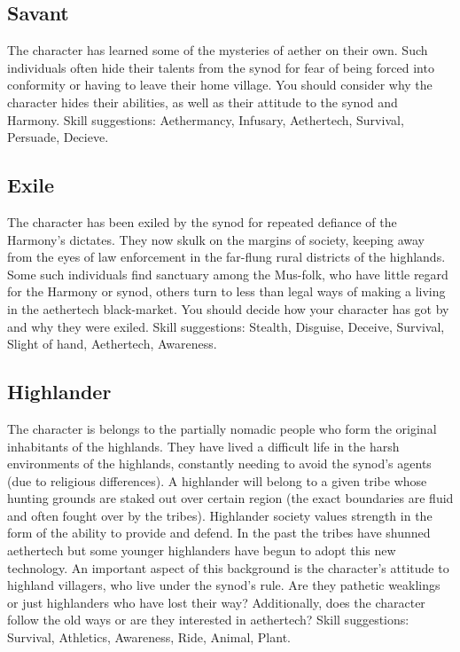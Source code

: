 \documentclass[a4paper,11pt,oneside]{book}
\begin{document}
\subsection{Savant}
The character has learned some of the mysteries of aether on their own. Such individuals often hide their talents from the synod for fear of being forced into conformity or having to leave their home village. You should consider why the character hides their abilities, as well as their attitude to the synod and Harmony. Skill suggestions: Aethermancy, Infusary, Aethertech, Survival, Persuade, Decieve. 

\subsection{Exile}
The character has been exiled by the synod for repeated defiance of the Harmony's dictates. They now skulk on the margins of society, keeping away from the eyes of law enforcement in the far-flung rural districts of the highlands. Some such individuals find sanctuary among the Mus-folk, who have little regard for the Harmony or synod, others turn to less than legal ways of making a living in the aethertech black-market. You should decide how your character has got by and why they were exiled. Skill suggestions: Stealth, Disguise, Deceive, Survival, Slight of hand, Aethertech, Awareness.  

\subsection{Highlander}
The character is belongs to the partially nomadic people who form the original inhabitants of the highlands. They have lived a difficult life in the harsh environments of the highlands, constantly needing to avoid the synod's agents (due to religious differences). A highlander will belong to a given tribe whose hunting grounds are staked out over certain region (the exact boundaries are fluid and often fought over by the tribes). Highlander society values strength in the form of the ability to provide and defend. In the past the tribes have shunned aethertech but some younger highlanders have begun to adopt this new technology. An important aspect of this background is the character's attitude to highland villagers, who live under the synod's rule. Are they pathetic weaklings or just highlanders who have lost their way? Additionally, does the character follow the old ways or are they interested in aethertech? Skill suggestions: Survival, Athletics, Awareness, Ride, Animal, Plant.  
\end{document}
